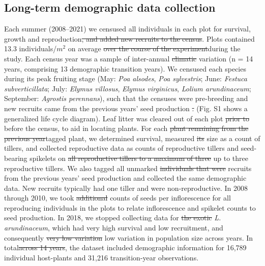 \documentclass[lineno,sn-nature]{sn-jnl}%
\providecommand{\DIFadd}[1]{{\protect\color{blue}#1}} %
\providecommand{\DIFdel}[1]{{\protect\color{red}\protect\scriptsize\sout{#1}}}
\providecommand{\DIFadd}[1]{{\protect\color{blue}\uwave{#1}}} %
\providecommand{\DIFdel}[1]{{\protect\color{red}\sout{#1}}}                      %
\providecommand{\DIFaddbegin}{} %
\providecommand{\DIFaddend}{} %
\providecommand{\DIFdelbegin}{} %
\providecommand{\DIFdelend}{} %
\newcommand{\DIFscaledelfig}{0.5}
\newlength{\DIFdelgraphicswidth} %
\newlength{\DIFdelgraphicsheight} %
\newcommand{\DIFaddincludegraphics}[2][]{{\color{blue}\fbox{\DIFOincludegraphics[#1]{#2}}}} %
\newcommand{\DIFdelincludegraphics}[2][]{%
\sbox{\DIFdelgraphicsbox}{\DIFOincludegraphics[#1]{#2}}%
\settoboxwidth{\DIFdelgraphicswidth}{\DIFdelgraphicsbox} %
\settoboxtotalheight{\DIFdelgraphicsheight}{\DIFdelgraphicsbox} %
\scalebox{\DIFscaledelfig}{%
\parbox[b]{\DIFdelgraphicswidth}{\usebox{\DIFdelgraphicsbox}\\[-\baselineskip] \rule{\DIFdelgraphicswidth}{0em}}\llap{\resizebox{\DIFdelgraphicswidth}{\DIFdelgraphicsheight}{%
\setlength{\unitlength}{\DIFdelgraphicswidth}%
\begin{picture}(1,1)%
\thicklines\linethickness{2pt} %
{\color[rgb]{1,0,0}\put(0,0){\framebox(1,1){}}}%
{\color[rgb]{1,0,0}\put(0,0){\line( 1,1){1}}}%
{\color[rgb]{1,0,0}\put(0,1){\line(1,-1){1}}}%
\end{picture}%
}\hspace*{3pt}}} %
} %
\DeclareRobustCommand{\DIFaddbegin}{\DIFOaddbegin \let\includegraphics\DIFaddincludegraphics} %
\DeclareRobustCommand{\DIFaddend}{\DIFOaddend \let\includegraphics\DIFOincludegraphics} %
\DeclareRobustCommand{\DIFdelbegin}{\DIFOdelbegin \let\includegraphics\DIFdelincludegraphics} %
\DeclareRobustCommand{\DIFdelend}{\DIFOaddend \let\includegraphics\DIFOincludegraphics} %
\begin{document}
	\subsection*{Long-term demographic data collection}
	Each summer (2008--2021) we censused all individuals in each plot for survival, growth and reproduction\DIFdelbegin \DIFdel{, and added new recruits to the census}\DIFdelend .
	Plots contained 13.3 individuals/$m^2$ on average \DIFdelbegin \DIFdel{over the course of the experiment}\DIFdelend \DIFaddbegin \DIFadd{during the study}\DIFaddend . 
	Each census year was a sample of inter-annual \DIFdelbegin \DIFdel{climatic }\DIFdelend variation (n = 14 years, comprising 13 demographic transition years).
	We censused each species during its peak fruiting stage (May: \emph{Poa alsodes}, \emph{Poa sylvestris}; June: \emph{Festuca subverticillata}; July: \emph{Elymus villosus}, \emph{Elymus virginicus}, \emph{Lolium arundinaceum}; September: \emph{Agrostis perennans}), such that the censuses were pre-breeding and new recruits came from the previous years' seed production \DIFdelbegin \DIFdel{.
	}\DIFdelend \DIFaddbegin \DIFadd{(Fig. S1 shows a generalized life cycle diagram).
	}\DIFaddend Leaf litter was cleared out of each plot \DIFdelbegin \DIFdel{prior to }\DIFdelend \DIFaddbegin \DIFadd{before }\DIFaddend the census, to aid in locating plants.
	For each \DIFdelbegin \DIFdel{plant remaining from the previous year}\DIFdelend \DIFaddbegin \DIFadd{tagged plant}\DIFaddend , we determined survival, measured \DIFdelbegin \DIFdel{its }\DIFdelend size as a count of tillers, and collected reproductive data as counts of reproductive tillers and seed-bearing spikelets on \DIFdelbegin \DIFdel{all reproductive tillers to a maximum of three }\DIFdelend \DIFaddbegin \DIFadd{up to three reproductive tillers}\DIFaddend . 
	We also tagged all unmarked \DIFdelbegin \DIFdel{individuals that were }\DIFdelend recruits from the previous years' seed production and collected the same demographic data. 
	New recruits typically had one tiller and were non-reproductive. 
	In 2008 through 2010, we took \DIFdelbegin \DIFdel{additional }\DIFdelend counts of seeds per inflorescence for all reproducing individuals in the plots to relate inflorescence and spikelet counts to seed production.
	In 2018, we stopped collecting data for \DIFdelbegin \DIFdel{the exotic }\DIFdelend \emph{L. arundinaceum}, which had very high survival and low recruitment, and consequently \DIFdelbegin \DIFdel{very low variation }\DIFdelend \DIFaddbegin \DIFadd{low variation in population size }\DIFaddend across years.
	In total\DIFdelbegin \DIFdel{across 14 years}\DIFdelend , the dataset included demographic information for 16,789 individual host-plants and 31,216 transition-year observations.
\end{document}
